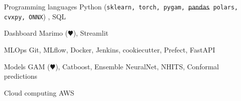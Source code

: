 \begin{cvskills}

\cvskill
    {Programming languages}
    {Python (\texttt{sklearn, torch, pygam, \st{pandas} polars, cvxpy, ONNX}) , SQL}

  \cvskill
    {Dashboard} 
    {Marimo ($\varheartsuit$), Streamlit}

    
    \cvskill
    {MLOps}
    {Git, MLflow, Docker, Jenkins, cookiecutter, Prefect, FastAPI}


    \cvskill
    {Models}
    {GAM ($\varheartsuit$), Catboost, Ensemble NeuralNet, NHITS, Conformal predictions}

    \cvskill
    {Cloud computing}
    {AWS}
\end{cvskills}


